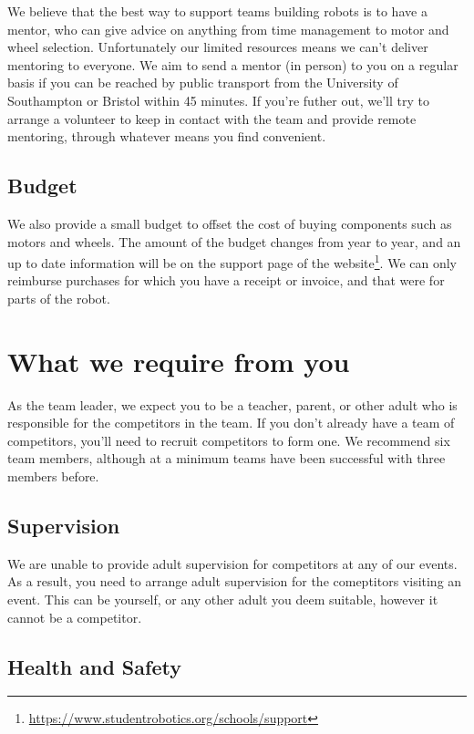 \documentclass[a4paper]{article}
\begin{document}
We believe that the best way to support teams building robots is to have a
mentor, who can give advice on anything from time management to motor and wheel
selection. Unfortunately our limited resources means we can't deliver mentoring
to everyone. We aim to send a mentor (in person) to you on a regular basis if
you can be reached by public transport from the University of Southampton or
Bristol within 45 minutes. If you're futher out, we'll try to arrange a
volunteer to keep in contact with the team and provide remote mentoring,
through whatever means you find convenient.

\subsection*{Budget}

We also provide a small budget to offset the cost of buying components such as
motors and wheels. The amount of the budget changes from year to year, and an
up to date information will be on the support page of the
website\footnote{\url{https://www.studentrobotics.org/schools/support}}. We
can only reimburse purchases for which you have a receipt or invoice, and that
were for parts of the robot.

\section*{What we require from you}

As the team leader, we expect you to be a teacher, parent, or other adult who
is responsible for the competitors in the team. If you don't already have a
team of competitors, you'll need to recruit competitors to form one. We
recommend six team members, although at a minimum teams have been successful
with three members before.

\subsection*{Supervision}

We are unable to provide adult supervision for competitors at any of our
events. As a result, you need to arrange adult supervision for the comeptitors
visiting an event. This can be yourself, or any other adult you deem suitable,
however it cannot be a competitor.

\subsection*{Health and Safety}
\end{document}

